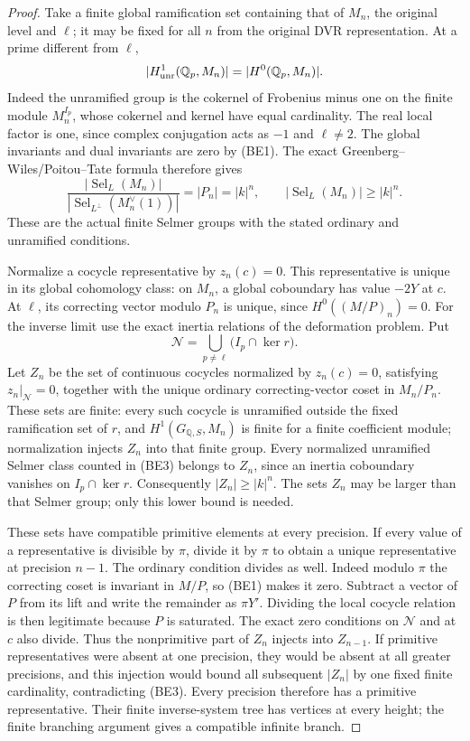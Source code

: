 \begin{proof}
Take a finite global ramification set containing that of
\(M_n\), the original level and \(\ell\); it may be fixed
for all \(n\) from the original DVR representation.
At a prime different from \(\ell\),
\[
                      |H^1_{\rm unr}(\mathbb Q_p,M_n)|
                                =|H^0(\mathbb Q_p,M_n)|.
\]
Indeed the unramified group is the cokernel of Frobenius
minus one on the finite module \(M_n^{I_p}\), whose
cokernel and kernel have equal cardinality.
The real local factor is one, since complex conjugation
acts as \(-1\) and \(\ell\ne2\).
The global invariants and dual invariants are zero by
(BE1).
The exact Greenberg--Wiles/Poitou--Tate formula therefore
gives
\[
 \frac{|\operatorname{Sel}_{L}(M_n)|}
      {|\operatorname{Sel}_{L^\perp}(M_n^\vee(1))|}
                       =|P_n|=|k|^n,
 \qquad |\operatorname{Sel}_{L}(M_n)|\ge|k|^n.              \tag{BE3}
\]
These are the actual finite Selmer groups with the stated
ordinary and unramified conditions.

Normalize a cocycle representative by \(z_n(c)=0\).
This representative is unique in its global cohomology
class: on \(M_n\), a global coboundary has value \(-2Y\)
at \(c\).
At \(\ell\), its correcting vector modulo \(P_n\) is
unique, since \(H^0((M/P)_n)=0\).
For the inverse limit use the exact inertia relations of the
deformation problem. Put
\[
 \mathcal N=\bigcup_{p\ne\ell}
                   \bigl(I_p\cap\ker r\bigr).
\]
Let \(Z_n\) be the set of continuous cocycles normalized by
\(z_n(c)=0\), satisfying \(z_n|_{\mathcal N}=0\), together
with the unique ordinary correcting-vector coset in
\(M_n/P_n\).
These sets are finite: every such cocycle is unramified
outside the fixed ramification set of \(r\), and
\(H^1(G_{\mathbb Q,S},M_n)\) is finite for a finite
coefficient module; normalization injects \(Z_n\) into
that finite group.
Every normalized unramified Selmer class counted in
(BE3) belongs to \(Z_n\), since an inertia coboundary
vanishes on \(I_p\cap\ker r\).
Consequently \(|Z_n|\ge|k|^n\).
The sets \(Z_n\) may be larger than that Selmer group;
only this lower bound is needed.

These sets have compatible primitive elements at every
precision.
If every value of a representative is divisible by \(\pi\),
divide it by \(\pi\) to obtain a unique representative at
precision \(n-1\).
The ordinary condition divides as well.
Indeed modulo \(\pi\) the correcting coset is invariant
in \(M/P\), so (BE1) makes it zero.
Subtract a vector of \(P\) from its lift and write the
remainder as \(\pi Y'\).
Dividing the local cocycle relation is then legitimate
because \(P\) is saturated.
The exact zero conditions on \(\mathcal N\) and at \(c\)
also divide.
Thus the nonprimitive part of \(Z_n\) injects into \(Z_{n-1}\).
If primitive representatives were absent at one precision,
they would be absent at all greater precisions, and this
injection would bound all subsequent \(|Z_n|\) by one fixed
finite cardinality, contradicting (BE3).
Every precision therefore has a primitive representative.
Their finite inverse-system tree has vertices at every
height; the finite branching argument gives a compatible
infinite branch.


\end{proof}

